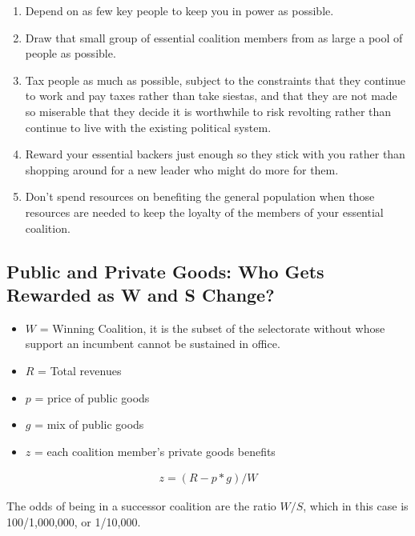 \begin{enumerate}
    \item Depend on as few key people to keep you in power as possible.
    
    \item Draw that small group of essential coalition members from as large a pool of people as possible.
    
    \item Tax people as much as possible, subject to the constraints that they continue to work and pay taxes rather than take siestas, and that they are not made so miserable that they decide it is worthwhile to risk revolting rather than continue to live with the existing political system.
    
    \item Reward your essential backers just enough so they stick with you rather than shopping around for a new leader who might do more for them.
    
    \item Don't spend resources on benefiting the general population when those resources are needed to keep the loyalty of the members of your essential coalition.
\end{enumerate}

\subsection{Public and Private Goods: Who Gets Rewarded as W and S Change?}

\begin{itemize}
    \item [] $W$ = Winning Coalition, it is the subset of the selectorate without whose support an incumbent cannot be sustained in office.
    \item [] $R$ = Total revenues
    \item [] $p$ = price of public goods
    \item [] $g$ = mix of public goods
    \item [] $z$ = each coalition member’s private goods benefits
\end{itemize}

\vspace*{-1em}
\begin{align*}
    z = (R - p*g)/W
\end{align*}

The odds of being in a successor coalition are the ratio $W/S$, which in this case is 100/1,000,000, or 1/10,000.

